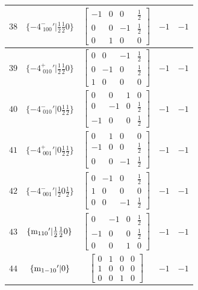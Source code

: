 \documentclass[fleqn,8pt]{jsarticle}
\begin{document}
\begin{longtable}{ccccc}
$ 38 $ & $ \{-4^{-}_{\,\,100}{}'|\frac{1}{2} \frac{1}{2} 0\} $ & $ \begin{bmatrix} -1 & 0 & 0 & \frac{1}{2} \\ 0 & 0 & -1 & \frac{1}{2} \\ 0 & 1 & 0 & 0 \end{bmatrix} $ & $ -1 $ & $ -1 $ \\ \hline
$ 39 $ & $ \{-4^{+}_{\,\,010}{}'|\frac{1}{2} \frac{1}{2} 0\} $ & $ \begin{bmatrix} 0 & 0 & -1 & \frac{1}{2} \\ 0 & -1 & 0 & \frac{1}{2} \\ 1 & 0 & 0 & 0 \end{bmatrix} $ & $ -1 $ & $ -1 $ \\ \hline
$ 40 $ & $ \{-4^{-}_{\,\,010}{}'|0 \frac{1}{2} \frac{1}{2}\} $ & $ \begin{bmatrix} 0 & 0 & 1 & 0 \\ 0 & -1 & 0 & \frac{1}{2} \\ -1 & 0 & 0 & \frac{1}{2} \end{bmatrix} $ & $ -1 $ & $ -1 $ \\ \hline
$ 41 $ & $ \{-4^{+}_{\,\,001}{}'|0 \frac{1}{2} \frac{1}{2}\} $ & $ \begin{bmatrix} 0 & 1 & 0 & 0 \\ -1 & 0 & 0 & \frac{1}{2} \\ 0 & 0 & -1 & \frac{1}{2} \end{bmatrix} $ & $ -1 $ & $ -1 $ \\ \hline
$ 42 $ & $ \{-4^{-}_{\,\,001}{}'|\frac{1}{2} 0 \frac{1}{2}\} $ & $ \begin{bmatrix} 0 & -1 & 0 & \frac{1}{2} \\ 1 & 0 & 0 & 0 \\ 0 & 0 & -1 & \frac{1}{2} \end{bmatrix} $ & $ -1 $ & $ -1 $ \\ \hline
$ 43 $ & $ \{{\rm m}_{110}{}'|\frac{1}{2} \frac{1}{2} 0\} $ & $ \begin{bmatrix} 0 & -1 & 0 & \frac{1}{2} \\ -1 & 0 & 0 & \frac{1}{2} \\ 0 & 0 & 1 & 0 \end{bmatrix} $ & $ -1 $ & $ -1 $ \\ \hline
$ 44 $ & $ \{{\rm m}_{1-10}{}'|0\} $ & $ \begin{bmatrix} 0 & 1 & 0 & 0 \\ 1 & 0 & 0 & 0 \\ 0 & 0 & 1 & 0 \end{bmatrix} $ & $ -1 $ & $ -1 $ \\ \hline

\end{longtable}
\end{document}
